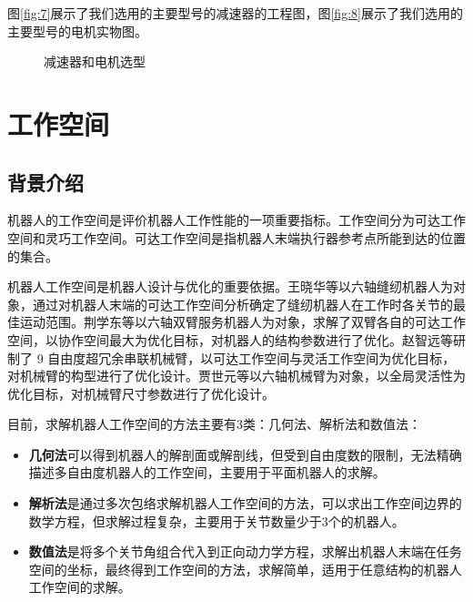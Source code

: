     图\ref{fig:7}展示了我们选用的主要型号的减速器的工程图，图\ref{fig:8}展示了我们选用的主要型号的电机实物图。
\begin{figure}[h]
    \centering
    \caption{减速器和电机选型}
\end{figure}
\newpage

\section{工作空间}
\subsection{背景介绍}
机器人的工作空间是评价机器人工作性能的一项重要指标。工作空间分为可达工作空间和灵巧工作空间。可达工作空间是指机器人末端执行器参考点所能到达的位置的集合。

机器人工作空间是机器人设计与优化的重要依据。王晓华等以六轴缝纫机器人为对象，通过对机器人末端的可达工作空间分析确定了缝纫机器人在工作时各关节的最佳运动范围。荆学东等以六轴双臂服务机器人为对象，求解了双臂各自的可达工作空间，以协作空间最大为优化目标，对机器人的结构参数进行了优化。赵智远等研制了 9 自由度超冗余串联机械臂，以可达工作空间与灵活工作空间为优化目标，对机械臂的构型进行了优化设计。贾世元等以六轴机械臂为对象，以全局灵活性为优化目标，对机械臂尺寸参数进行了优化设计。

目前，求解机器人工作空间的方法主要有3类：几何法、解析法和数值法：
\begin{itemize}
    \item \textbf{几何法}可以得到机器人的解剖面或解剖线，但受到自由度数的限制，无法精确描述多自由度机器人的工作空间，主要用于平面机器人的求解。
    \item \textbf{解析法}是通过多次包络求解机器人工作空间的方法，可以求出工作空间边界的数学方程，但求解过程复杂，主要用于关节数量少于3个的机器人。
    \item \textbf{数值法}是将多个关节角组合代入到正向动力学方程，求解出机器人末端在任务空间的坐标，最终得到工作空间的方法，求解简单，适用于任意结构的机器人工作空间的求解。
\end{itemize}

